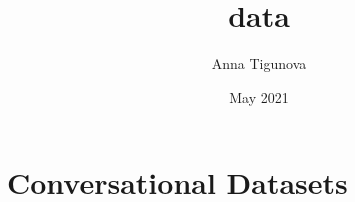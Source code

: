 \documentclass[11pt, oneside]{book}
\title{data}
\author{Anna Tigunova}
\date{May 2021}
\begin{document}
\chapter{Conversational Datasets}








\end{document}
